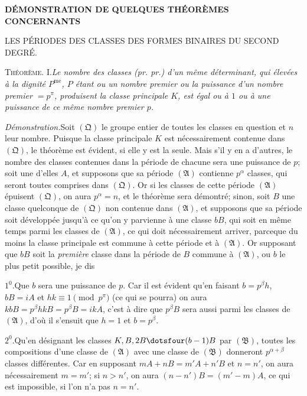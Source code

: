 \clearpage
{}
\renewcommand{\BookRunningTitle}{Démonstration de quelques théorèmes}
\begin{center}
\Large\bfseries DÉMONSTRATION DE QUELQUES THÉORÈMES CONCERNANTS\par\medskip
\large LES PÉRIODES DES CLASSES DES FORMES BINAIRES DU SECOND DEGRÉ.
\end{center}

\textsc{Théorème. I.}\quad\emph{Le nombre des classes (pr. pr.) d’un même déterminant, qui élevées à la dignité $P^{\mathrm{me}}$, $P$ étant ou un nombre premier ou la puissance d’un nombre premier $=p^\pi$, produisent la classe principale $K$, est égal ou à $1$ ou à une puissance de ce même nombre premier $p$.}

\emph{Démonstration.}\quad Soit $(\mathfrak Q)$ le groupe entier de toutes les classes en question et $n$ leur nombre. Puisque la classe principale $K$ est nécessairement contenue dans $(\mathfrak Q)$, le théorème est évident, si elle y est la seule. Mais s’il y en a d’autres, le nombre des classes contenues dans la période de chacune sera une puissance de $p$; soit une d’elles $A$, et supposons que sa période $(\mathfrak A)$ contienne $p^\alpha$ classes, qui seront toutes comprises dans $(\mathfrak Q)$. Or si les classes de cette période $(\mathfrak A)$ épuisent $(\mathfrak Q)$, on aura $p^\alpha=n$, et le théorème sera démontré; sinon, soit $B$ une classe quelconque de $(\mathfrak Q)$ non contenue dans $(\mathfrak A)$, et supposons que sa période soit développée jusqu’à ce qu’on y parvienne à une classe $bB$, qui soit en même temps parmi les classes de $(\mathfrak A)$, ce qui doit nécessairement arriver, parceque du moins la classe principale est commune à cette période et à $(\mathfrak A)$. Or supposant que $bB$ soit la \emph{première} classe dans la période de $B$ commune à $(\mathfrak A)$, ou $b$ le plus petit possible, je dis

$1^0$.\quad Que $b$ sera une puissance de $p$. Car il est évident qu’en faisant $b=p^\beta h$, $bB=iA$ et $hk\equiv1\pmod{p^\pi}$ (ce qui se pourra) on aura $kbB=p^\beta hkB=p^\beta B=ikA$,
c’est à dire que $p^\beta B$ sera aussi parmi les classes de $(\mathfrak A)$, d’où il s’ensuit que $h=1$ et $b=p^\beta$.

$2^0$.\quad Qu’en désignant les classes $K,B,2B\dotsfour(b-1)B$ par $(\mathfrak B)$, toutes les compositions d’une classe de $(\mathfrak A)$ avec une classe de $(\mathfrak B)$ donneront $p^{\alpha+\beta}$ classes différentes. Car en supposant $mA+nB=m'A+n'B$ et $n=n'$, on aura nécessairement $m=m'$; si $n>n'$, on aura $(n-n')B=(m'-m)A$, ce qui est impossible, si l’on n’a pas $n=n'$.

